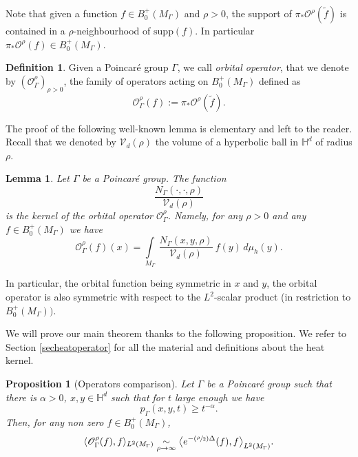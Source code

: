 \documentclass[JEP,XML,SOM,Unicode,NoFloatCountersInSection,published]{cedram}
\let\mathcal\mathscr
\newcommand{\Psfrac}[2]{(\sfrac{#1}{#2})}
\theoremstyle{plain}
\newtheorem{proposition}[equation]{Proposition}
\newtheorem{lemma}[equation]{Lemma}
\theoremstyle{definition}
\newtheorem{definition}[equation]{Definition}
\newcommand{\HH}{\mathbb{H}}
\newcommand{\inte}[1]{\underset{#1}{\int}}
\newcommand{\supp}[1]{\mathrm{supp}(#1)}
\newcommand{\equivaut}[1]{\underset{#1}{\sim}}
\begin{document}
Note that given a function $f \in B^+_0(M_{\Gamma})$ and $\rho > 0$, the support of $\pi_*\mathcal{O}^{\rho}(\tilde{f})$ is contained in a $\rho$-neighbourhood of $\supp{f}$. In particular $\pi_*\mathcal{O}^{\rho}(f) \in B^+_0(M_{\Gamma})$.

\begin{definition}
Given a Poincaré group $\Gamma$, we call \emph{orbital operator}, that we denote by $(\mathcal{O}_{\Gamma}^\rho)_{\rho > 0}$, the family of operators acting on $B^+_0(M_{\Gamma})$ defined as
\[
\mathcal{O}_{\Gamma}^{\rho}(f) := \pi_* \mathcal{O}^{\rho}(\tilde{f}).
\]
\end{definition}

The proof of the following well-known lemma is elementary and left to the reader. Recall that we denoted by $\mathcal{V}_d(\rho)$ the volume of a hyperbolic ball in $\HH^d$ of radius $\rho$.
\begin{lemma}
\label{lemmaaverage}
Let $\Gamma$ be a Poincaré group. The function
\[
\frac{N_{\Gamma}(\cdot, \cdot, \rho)}{\mathcal{V}_d(\rho)}
\]
is the kernel of the orbital operator $\mathcal{O}_{\Gamma}^{\rho}$. Namely, for any $\rho > 0$ and any $f \in B^+_0(M_{\Gamma})$ we have
\[
\mathcal{O}_{\Gamma}^{\rho}(f)(x) = \inte{M_{\Gamma}} \ \frac{N_{\Gamma}(x,y,\rho)}{\mathcal{V}_d(\rho)} \ f(y) \,d \mu_h(y).
\]
\end{lemma}

In particular, the orbital function being symmetric in $x$ and $y$, the orbital operator is also symmetric with respect to the $L^2$-scalar product (in restriction to $B^+_0(M_{\Gamma}))$.

We will prove our main theorem thanks to the following proposition. We refer to Section \ref{secheatoperator} for all the material and definitions about the heat kernel.

\begin{proposition}[Operators comparison]
\label{propmaintheo}
Let $\Gamma$ be a Poincaré group such that there is $\alpha > 0$, $x,y \in \mathbb{H}^d$ such that for $t$ large enough we have
\[
p_{\Gamma}(x,y,t) \ge t^{-\alpha}.
\]
Then, for any non zero $f \in B^+_0(M_{\Gamma})$,
\[
\langle \mathcal{O}_{\Gamma}^{\rho}(f), f \rangle_{L^2(M_{\Gamma})} \equivaut{\rho \to \infty} \bigl< e^{- \Psfrac{\rho}{2} \Delta}(f), f \bigr>_{L^2(M_{\Gamma})}.
\]
\end{proposition}
\end{document}
